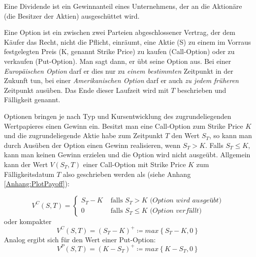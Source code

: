 \begin{Definition}[Dividende]
Eine Dividende ist ein Gewinnanteil eines Unternehmens, der an die Aktionäre (die Besitzer der Aktien) ausgeschüttet wird.
\end{Definition}


\begin{Definition}[Option]
Eine Option ist ein zwischen zwei Parteien abgeschlossener Vertrag, der dem Käufer das Recht, nicht die Pflicht, einräumt, eine Aktie (S) zu einem im Vorraus festgelegten Preis (K, genannt \glqq Strike Price\grqq) zu kaufen (Call-Option) oder zu verkaufen (Put-Option). Man sagt dann, \glqq er übt seine Option aus\grqq. Bei einer \textit{Europäischen Option} darf er dies nur zu \textit{einem bestimmten} Zeitpunkt in der Zukunft tun, bei einer \textit{Amerikanischen Option} darf er auch \textit{zu jedem früheren} Zeitpunkt ausüben. Das Ende dieser Laufzeit wird mit $T$ beschrieben und Fälligkeit genannt.
\end{Definition}

Optionen bringen je nach Typ und Kursentwicklung des zugrundeliegenden Wertpapieres einen Gewinn ein. Besitzt man eine Call-Option zum Strike Price $K$ und die zugrundeliegende Aktie habe zum Zeitpunkt $T$ den Wert $S_T$, so kann man durch Ausüben der Option einen Gewinn realisieren, wenn $S_T>K$. Falls $S_T \leq K$, kann man keinen Gewinn erzielen und die Option wird nicht ausgeübt.
Allgemein kann der Wert $V(S_T,T)$ einer Call-Option mit Strike Price $K$ zum Fälligkeitsdatum $T$ also geschrieben werden als (siehe Anhang \ref{Anhang:PlotPayoff}):

\begin{equation*}
V^C\left(S,T\right) = 
\begin{cases}
S_T - K   & \text{ falls }     S_T > K           \textit{   (Option wird ausgeübt)} \\
0         & \text{ falls }     S_T \leq K      \textit{   (Option verfällt)}  
\end{cases}
\end{equation*}
oder kompakter
\begin{equation}
V^C\left(S,T\right) = \left(S_T-K\right)^+ \coloneqq max\left\{S_T-K,0\right\} \label{GL:payoffCall}
\end{equation}
Analog ergibt sich für den Wert einer Put-Option:
\begin{equation}
V^P\left(S,T\right) = \left(K-S_T\right)^+ \coloneqq max\left\{K-S_T,0\right\} \label{GL:payoffPut}
\end{equation}

